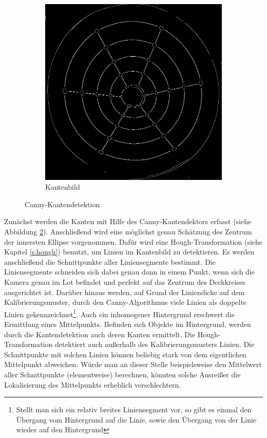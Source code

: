 \begin{figure}[!htb]
\begin{subfigure}{.5\textwidth}
		\includegraphics[width=.9\textwidth]{images/canny.png}
		\caption{Kantenbild}
		\label{fig:afterCanny}
	\end{subfigure}
	\caption{Canny-Kantendetektion}
	\label{fig:canny}
\end{figure}

Zunächst werden die Kanten mit Hilfe des Canny-Kantendektors \cite{Canny1986} erfasst (siehe Abbildung \ref{fig:canny}).
Anschließend wird eine möglichst genau Schätzung des Zentrum der innersten Ellipse vorgenommen.
Dafür wird eine Hough-Transformation (siehe Kapitel \ref{s:hough}) benutzt, um Linien im Kantenbild zu detektieren.
Es werden anschließend die Schnittpunkte aller Liniensegmente bestimmt.
Die Liniensegmente schneiden sich dabei genau dann in einem Punkt, wenn sich die Kamera genau im Lot befindet und perfekt auf das Zentrum des Deckkreises ausgerichtet ist.
Darüber hinaus werden, auf Grund der Liniendicke auf dem Kalibrierungsmuster, durch den Canny-Algorithmus viele Linien als doppelte Linien gekennzeichnet\footnote{Stellt man sich ein relativ breites Liniensegment vor, so gibt es einmal den Übergang vom Hintergrund auf die Linie, sowie den Übergang von der Linie wieder auf den Hintergrund}. Auch ein inhomogener Hintergrund erschwert die Ermittlung eines Mittelpunkts. Befinden sich Objekte im Hintergrund, werden durch die Kantendetektion auch deren Kanten ermittelt. Die Hough-Transformation detektiert auch außerhalb des Kalibrierungsmusters Linien. Die Schnittpunkte mit solchen Linien können beliebig stark von dem eigentlichen Mittelpunkt abweichen. Würde man an dieser Stelle beispielsweise den Mittelwert aller Schnittpunkte (elementweise) berechnen, könnten solche Ausreißer die Lokalisierung des Mittelpunkts erheblich verschlechtern.

